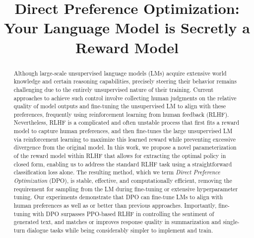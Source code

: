 \title{Direct Preference Optimization: Your Language Model is Secretly a Reward Model}

\begin{abstract}
Although large-scale unsupervised language models (LMs) acquire extensive world knowledge and certain reasoning capabilities, precisely steering their behavior remains challenging due to the entirely unsupervised nature of their training. Current approaches to achieve such control involve collecting human judgments on the relative quality of model outputs and fine-tuning the unsupervised LM to align with these preferences, frequently using reinforcement learning from human feedback (RLHF). Nevertheless, RLHF is a complicated and often unstable process that first fits a reward model to capture human preferences, and then fine-tunes the large unsupervised LM via reinforcement learning to maximize this learned reward while preventing excessive divergence from the original model. In this work, we propose a novel parameterization of the reward model within RLHF that allows for extracting the optimal policy in closed form, enabling us to address the standard RLHF task using a straightforward classification loss alone. The resulting method, which we term \textit{Direct Preference Optimization} (DPO), is stable, effective, and computationally efficient, removing the requirement for sampling from the LM during fine-tuning or extensive hyperparameter tuning. Our experiments demonstrate that DPO can fine-tune LMs to align with human preferences as well as or better than previous approaches. Importantly, fine-tuning with DPO surpasses PPO-based RLHF in controlling the sentiment of generated text, and matches or improves response quality in summarization and single-turn dialogue tasks while being considerably simpler to implement and train.
\end{abstract}

